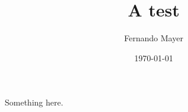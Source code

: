 \documentclass[a4paper]{article}
\title{A test}
\author{Fernando Mayer}
\date{\today}
\begin{document}
\maketitle

Something here.
\end{document}
